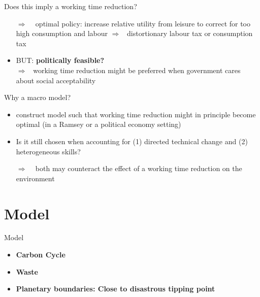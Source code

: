 \documentclass[11pt,aspectratio=169]{beamer}
\newcommand{\ar}{$\Rightarrow$ \ }
\begin{document}
\begin{frame}{Does this imply a working time reduction?}
	
	\begin{itemize}
	\item[\ar] optimal policy: increase relative utility from leisure to correct for too high consumption and labour \ar distortionary labour tax or consumption tax
	\item BUT: \textbf{\alert{politically feasible?}} \\ \ar working time reduction might be preferred when government cares about social acceptability \citep{Alvarez-Cuadrado2007EnvyHours}

\end{itemize}
\end{frame}

\begin{frame}{Why a macro model?}

\begin{itemize}
	\item construct model such that working time reduction might in principle become optimal (in a Ramsey or a political economy setting)
	\item Is it still chosen when accounting for (1) directed technical change and (2) heterogeneous skills?
	\item[\ar] both may counteract the effect of a working time reduction on the environment
\end{itemize}

\end{frame}

\section{Model}
\begin{frame}{Model}
\begin{itemize}
\item \textbf{Carbon Cycle}
\item \textbf{Waste}
\item \textbf{Planetary boundaries: Close to disastrous tipping point }
\end{itemize}
\end{frame}
\end{document}
